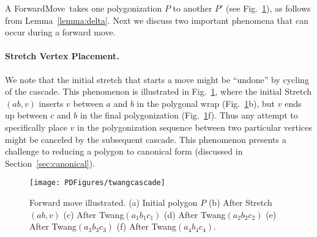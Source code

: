\pdfoutput=1  \documentclass{article}
\def\st{{\sc Stretch}}
\def\tw{{\sc Twang}}
\def\fm{{\sc ForwardMove}}
\newcommand{\hide}[1]{}
\newcommand{\figlab}[1]{\label{fig:#1}}
\newcommand{\lemref}[1]{\ref{lemma:#1}}
\newcommand{\secref}[1]{\ref{sec:#1}}
\newcommand{\figref}[1]{\ref{fig:#1}}
\begin{document}
A \fm\ takes one polygonization $P$ to another $P'$ (see
Fig.~\figref{twang.cascade}), as follows from
Lemma~\lemref{delta}.
Next we discuss two important phenomena that can occur
during a forward move.


\vspace{-0.5em}
\paragraph{Stretch Vertex Placement.} We note that the initial
stretch that starts a move might be ``undone''
by cycling of the cascade. This phenomenon is illustrated in
Fig.~\figref{twang.cascade}, where the initial \st$(ab,v)$ inserts
$v$ between $a$ and $b$ in the polygonal wrap
(Fig.~\figref{twang.cascade}b), but $v$ ends up between $c$ and $b$
in the final polygonization (Fig.~\figref{twang.cascade}f). Thus any
attempt to specifically place $v$ in the polygonization sequence
between two particular vertices might be canceled by the subsequent
cascade. This phenomenon presents a challenge to reducing a polygon
to canonical form (discussed in Section~\secref{canonical}).

\vspace{-1.5em}
\begin{figure}[htbp]
\centering
\texttt{[image: PDFigures/twangcascade]}
\vspace{-1.7em} \caption{Forward move illustrated. (a) Initial
polygon $P$ (b) After \st$(ab, v)$ (c) After \tw$(a_1b_1c_1)$ (d)
After \tw$(a_2b_2c_2)$ (e) After \tw$(a_3b_3c_3)$ (f) After
\tw$(a_4b_4c_4)$.\vspace{-0.7em}} \figlab{twang.cascade}
\end{figure}


\hide{
\paragraph{Multiple Vertex Twangs.}
A point can twang more than once during the twang cascade, as
illustrated in Fig.~\figref{double.twang}. 
This possibility blocks one route toward
establishing a combinatorial upper bound on the number
of twangs in a cascade.
Note that in the example in Fig.~\figref{double.twang}g, there
is a choice about which vertex sequence to twang (either $a_6vc_6$
or $xvy$) and that only \tw($a_6vc_6$) leads to $v$ twanging twice.
We conjecture that 
a judicious choice of twang sequence
will lead to a linear bound on the number of
twangs in a cascade.


\vspace{-0.5em}
\begin{figure}[htbp]
\centering
\texttt{[image: PDFigures/doubletwang]}
\vspace{-1.7em}\caption{Point $v$ twangs twice: (a) Initial $P$ (b)
After  \st$(e, b_1)$ (c--i) After \tw$(a_ib_ic_i)$, $i = 1 \ldots 7$
(i) $v$ in double contact a second time. } \figlab{double.twang}
\end{figure}
}
\end{document}
